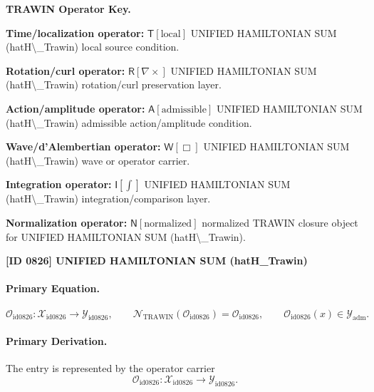 \par\vspace{0.45\baselineskip}
\noindent\begin{minipage}[t]{\linewidth}
\begingroup
\small
\raggedright
\textbf{TRAWIN Operator Key.}\par
\noindent\textbf{Time/localization operator:} $\mathsf{T}\!\left[\mathrm{local}\right]$ UNIFIED HAMILTONIAN SUM (hatH\textbackslash{}\_Trawin) local source condition.\par
\noindent\textbf{Rotation/curl operator:} $\mathsf{R}\!\left[\nabla\times\right]$ UNIFIED HAMILTONIAN SUM (hatH\textbackslash{}\_Trawin) rotation/curl preservation layer.\par
\noindent\textbf{Action/amplitude operator:} $\mathsf{A}\!\left[\mathrm{admissible}\right]$ UNIFIED HAMILTONIAN SUM (hatH\textbackslash{}\_Trawin) admissible action/amplitude condition.\par
\noindent\textbf{Wave/d'Alembertian operator:} $\mathsf{W}\!\left[\Box\right]$ UNIFIED HAMILTONIAN SUM (hatH\textbackslash{}\_Trawin) wave or operator carrier.\par
\noindent\textbf{Integration operator:} $\mathsf{I}\!\left[\int\right]$ UNIFIED HAMILTONIAN SUM (hatH\textbackslash{}\_Trawin) integration/comparison layer.\par
\noindent\textbf{Normalization operator:} $\mathsf{N}\!\left[\mathrm{normalized}\right]$ normalized TRAWIN closure object for UNIFIED HAMILTONIAN SUM (hatH\textbackslash{}\_Trawin).\par
\endgroup
\end{minipage}

\clearpage
\noindent\textbf{[ID 0826] UNIFIED HAMILTONIAN SUM (hatH\_Trawin)}\par
\vspace{0.35em}
\paragraph{Primary Equation.}
\[
\mathcal{O}_{\mathrm{id0826}}:\mathcal{X}_{\mathrm{id0826}}\longrightarrow \mathcal{Y}_{\mathrm{id0826}},\qquad
\mathcal{N}_{\mathrm{TRAWIN}}(\mathcal{O}_{\mathrm{id0826}})=\mathcal{O}_{\mathrm{id0826}},\qquad
\mathcal{O}_{\mathrm{id0826}}(x)\in\mathcal{Y}_{\mathrm{adm}}.
\]

\paragraph{Primary Derivation.} The entry is represented by the operator carrier\[
\mathcal{O}_{\mathrm{id0826}}:\mathcal{X}_{\mathrm{id0826}}\longrightarrow \mathcal{Y}_{\mathrm{id0826}}.
\]

